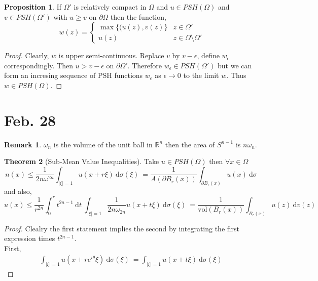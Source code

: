 \documentclass[12pt]{extarticle}
\newcommand{\R}{\mathbb{R}}
\renewcommand{\d}[1]{\: \mathrm{d}#1 \:}
\theoremstyle{definition}
\newtheorem{theorem}{Theorem}[section]
\newtheorem{proposition}[theorem]{Proposition}
\newtheorem{remark}{Remark}
\begin{document}
\begin{proposition}
If $\Omega'$ is relatively compact in $\Omega$ and $u \in PSH(\Omega)$ and $v \in PSH(\Omega')$ with $u \ge v$ on $\partial \Omega$ then the function,
\[ w(z) = 
\begin{cases}
\max\{(u(z), v(z)\} & z \in \Omega'
\\
u(z) & z \in \Omega \setminus \Omega'
\end{cases} \]
\end{proposition}

\begin{proof}
Clearly, $w$ is upper semi-continuous. Replace $v$ by $v - \epsilon$, define $w_\epsilon$ correspondingly. Then $u > v - \epsilon$ on $\partial \Omega'$. Therefore $w_\epsilon \in PSH(\Omega')$ but we can form an incresing sequence of PSH functions $w_\epsilon$ as $\epsilon \to 0$ to the limit $w$. Thus $w \in PSH(\Omega)$. 
\end{proof}

\section{Feb. 28}

\begin{remark}
$\omega_n$ is the volume of the unit ball in $\R^n$ then the area of $S^{n-1}$ is $n \omega_n$. 
\end{remark}

\begin{theorem}[Sub-Mean Value Inequalities]
Take $u \in PSH(\Omega)$ then $\forall x \in \Omega$
\[ n(x) \le \frac{1}{2n \omega^{2n}} \int_{|\xi| = 1} u(x + r \xi) \d{\sigma(\xi)} = \frac{1}{A(\partial B_r(x))} \int_{\partial B_r(x)} u(x) \d{\sigma} \]
and also,
\[ u(x) \le \frac{1}{r^{2n}} \int_0^r t^{2n - 1} \d{t} \int_{|\xi| = 1} \frac{1}{2 n \omega_{2n}} u(x + t \xi) \d{\sigma(\xi)} = \frac{1}{\text{vol}(B_r(x))} \int_{B_r(x)} u(z) \d{v(z)} \] 
\end{theorem}

\begin{proof}
Clealry the first statement implies the second by integrating the first expression times $t^{2n - 1}$. 
\bigskip\\
First,
\begin{align*}
\int_{|\xi| = 1} u(x + r e^{i \theta} \xi) \d{\sigma(\xi)} = \int_{|\xi| = 1} u(x + t \xi) \d{\sigma(\xi)} 
\end{align*}
\end{proof}
\end{document}
